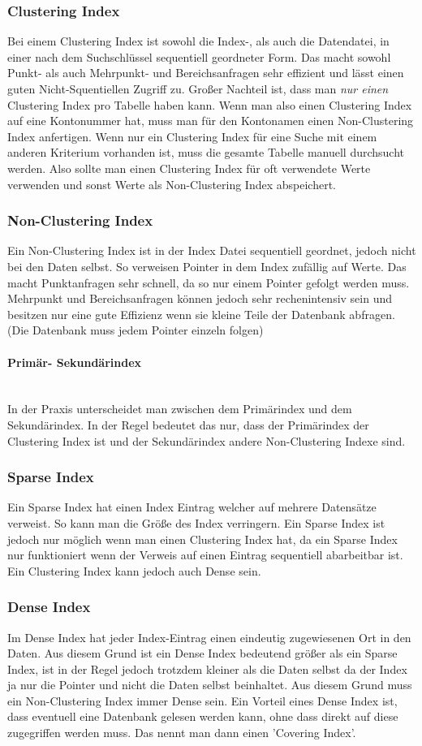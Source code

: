 \documentclass{article}
\newcommand{\paragraphlb}[1]{\paragraph{#1}\mbox{}\\}
\begin{document}
	\subsubsection{Clustering Index}
	Bei einem Clustering Index ist sowohl die Index-, als auch die Datendatei, in einer nach dem Suchschlüssel sequentiell geordneter Form. Das macht sowohl Punkt- als auch Mehrpunkt- und Bereichsanfragen sehr effizient und lässt einen guten Nicht-Squentiellen Zugriff zu. Großer Nachteil ist, dass man \textit{nur einen} Clustering Index pro Tabelle haben kann. Wenn man also einen Clustering Index auf eine Kontonummer hat, muss man für den Kontonamen einen Non-Clustering Index anfertigen. Wenn nur ein Clustering Index für eine Suche mit einem anderen Kriterium vorhanden ist, muss die gesamte Tabelle manuell durchsucht werden. Also sollte man einen Clustering Index für oft verwendete Werte verwenden und sonst Werte als Non-Clustering Index abspeichert.
	\subsubsection{Non-Clustering Index}
	Ein Non-Clustering Index ist in der Index Datei sequentiell geordnet, jedoch nicht bei den Daten selbst. So verweisen Pointer in dem Index zufällig auf Werte. Das macht Punktanfragen sehr schnell, da so nur einem Pointer gefolgt werden muss. Mehrpunkt und Bereichsanfragen können jedoch sehr rechenintensiv sein und besitzen nur eine gute Effizienz wenn sie kleine Teile der Datenbank abfragen. (Die Datenbank muss jedem Pointer einzeln folgen)
	\paragraphlb{Primär- Sekundärindex}
	In der Praxis unterscheidet man zwischen dem Primärindex und dem Sekundärindex. In der Regel bedeutet das nur, dass der Primärindex der Clustering Index ist und der Sekundärindex andere Non-Clustering Indexe sind.
	\subsubsection{Sparse Index}
	Ein Sparse Index hat einen Index Eintrag welcher auf mehrere Datensätze verweist. So kann man die Größe des Index verringern. Ein Sparse Index ist jedoch nur möglich wenn man einen Clustering Index hat, da ein Sparse Index nur funktioniert wenn der Verweis auf einen Eintrag sequentiell abarbeitbar ist. Ein Clustering Index kann jedoch auch Dense sein.
	\subsubsection{Dense Index}
	Im Dense Index hat jeder Index-Eintrag einen eindeutig zugewiesenen Ort in den Daten. Aus diesem Grund ist ein Dense Index bedeutend größer als ein Sparse Index, ist in der Regel jedoch trotzdem kleiner als die Daten selbst da der Index ja nur die Pointer und nicht die Daten selbst beinhaltet. Aus diesem Grund muss ein Non-Clustering Index immer Dense sein. Ein Vorteil eines Dense Index ist, dass eventuell eine Datenbank gelesen werden kann, ohne dass direkt auf diese zugegriffen werden muss. Das nennt man dann einen 'Covering Index'.
\end{document}

